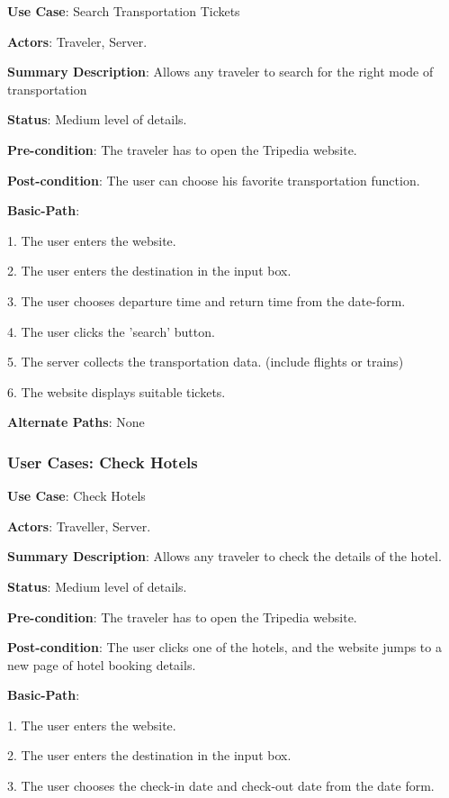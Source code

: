 \documentclass[conference]{IEEEtran}
\begin{document}
\textbf{ }

\textbf{Use Case}: Search Transportation Tickets

\textbf{Actors}: Traveler, Server.

\textbf{Summary Description}: Allows any traveler to search for the right mode of transportation

\textbf{Status}: Medium level of details.

\textbf{Pre-condition}: The traveler has to open the Tripedia website.

\textbf{Post-condition}: The user can choose his favorite transportation function.

\textbf{Basic-Path}:

1. The user enters the website.

2. The user enters the destination in the input box.

3. The user chooses departure time and return time from the date-form.

4. The user clicks the 'search' button.

5. The server collects the transportation data. (include flights or trains)

6. The website displays suitable tickets. 


\textbf{Alternate Paths}: None

\subsubsection{User Cases: Check Hotels}

\textbf{ }

\textbf{Use Case}: Check Hotels

\textbf{Actors}: Traveller, Server.

\textbf{Summary Description}: Allows any traveler to check the details of the hotel.

\textbf{Status}: Medium level of details.

\textbf{Pre-condition}: The traveler has to open the Tripedia website.

\textbf{Post-condition}: The user clicks one of the hotels, and the website jumps to a new page of hotel booking details.

\textbf{Basic-Path}:

1. The user enters the website.

2. The user enters the destination in the input box.

3. The user chooses the check-in date and check-out date from the date form.
\end{document}
